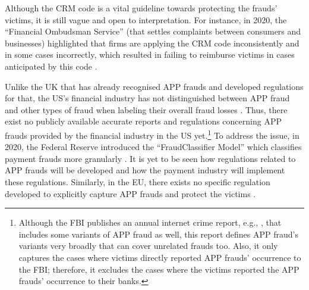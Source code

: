 Although the CRM code is a vital guideline  towards protecting  the frauds' victims, it is still  vague and open to interpretation. For instance, in 2020, the ``Financial Ombudsman Service'' (that settles complaints between consumers and businesses)  highlighted that firms  are applying the CRM code inconsistently and in some cases incorrectly, which resulted in failing to reimburse victims in cases anticipated by this code \cite{Financial-Ombudsman-Service-response}.  %



Unlike the UK that has already recognised APP frauds and developed regulations for that,  the US's financial industry has not distinguished between APP fraud and other types of  fraud when labeling their overall fraud losses \cite{P20-report}. Thus, there exist no publicly available accurate reports and regulations concerning APP frauds provided by the financial industry in the US yet.\footnote{Although the FBI publishes  an annual internet crime report, e.g.,  \cite{internet-crime-report}, that includes some variants of APP fraud as well,  this report defines APP fraud's variants very broadly that can cover unrelated frauds too.  Also, it only captures the cases where victims directly reported  APP frauds' occurrence to the FBI; therefore, it excludes the cases where the victims reported the APP frauds' occurrence to their banks.}  To address the issue, in 2020, the Federal Reserve introduced the ``FraudClassifier Model'' which classifies payment frauds more granularly \cite{Fraud-Classifier}. It is yet to be seen how  regulations related to APP frauds  will be developed and how the payment industry will implement these regulations. Similarly, in the EU, there  exists no specific regulation developed 
%
%
%
to explicitly capture APP frauds and protect the victims \cite{kjorven2020pays,McIlroy2021}.















